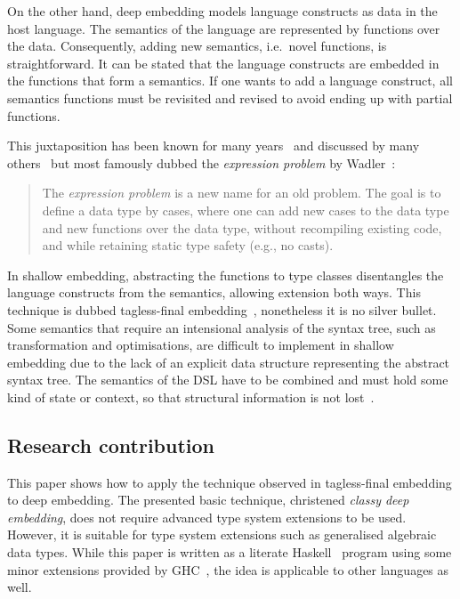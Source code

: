 \documentclass[runningheads]{llncs}
\begin{document}
On the other hand, deep embedding models language constructs as data in the host language.
The semantics of the language are represented by functions over the data.
Consequently, adding new semantics, i.e.\ novel functions, is straightforward.
It can be stated that the language constructs are embedded in the functions that form a semantics.
If one wants to add a language construct, all semantics functions must be revisited and revised to avoid ending up with partial functions.

This juxtaposition has been known for many years~\cite{reynolds_user-defined_1978} and discussed by many others~\cite{krishnamurthi_synthesizing_1998} but most famously dubbed the \emph{expression problem} by Wadler~\cite{wadler_expression_1998}:

\begin{quote}
	The \emph{expression problem} is a new name for an old problem.
	The goal is to define a data type by cases, where one can add new cases to the data type and new functions over the data type, without recompiling existing code, and while retaining static type safety (e.g., no casts).
\end{quote}

In shallow embedding, abstracting the functions to type classes disentangles the language constructs from the semantics, allowing extension both ways.
This technique is dubbed tagless-final embedding~\cite{carette_finally_2009}, nonetheless it is no silver bullet.
Some semantics that require an intensional analysis of the syntax tree, such as transformation and optimisations, are difficult to implement in shallow embedding due to the lack of an explicit data structure representing the abstract syntax tree.
The semantics of the DSL have to be combined and must hold some kind of state or context, so that structural information is not lost~\cite{kiselyov_typed_2012}.

\subsection{Research contribution}
This paper shows how to apply the technique observed in tagless-final embedding to deep embedding.
The presented basic technique, christened \emph{classy deep embedding}, does not require advanced type system extensions to be used.
However, it is suitable for type system extensions such as generalised algebraic data types.
While this paper is written as a literate
Haskell~\cite{peyton_jones_haskell_2003} program using some minor extensions provided by GHC~\cite{ghc_team_ghc_2021}, the idea is applicable to other languages as well\footnotemark{}.
\end{document}
